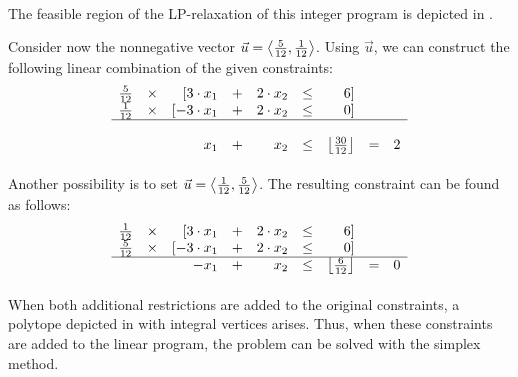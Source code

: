 {\begin{example}
\paragraph{}
The feasible region of the LP-relaxation of this integer program is depicted in .



Consider now the nonnegative vector $\vec{u}=\left\langle \frac{5}{12},\frac{1}{12} \right\rangle$. Using $\vec{u}$, we can construct the following linear combination of the given constraints:
\begin{equation}
\begin{array}{rcrcrcrcr}
\tfrac{5}{12}&\times&[3\cdot x_1&+&2\cdot x_2&\leq&6]&&\\
\tfrac{1}{12}&\times&[-3\cdot x_1&+&2\cdot x_2&\leq&0]&&\\\hline\\
&&x_1&+&x_2&\leq&\left\lfloor \frac{30}{12} \right\rfloor&=&2
\end{array}
\end{equation}

\paragraph{}
Another possibility is to set $\vec{u}=\left\langle \frac{1}{12},\frac{5}{12} \right\rangle$. The resulting constraint can be found as follows:
\begin{equation}
\begin{array}{rcrcrcrcr}
\tfrac{1}{12}&\times&[3\cdot x_1&+&2\cdot x_2&\leq&6]&&\\
\tfrac{5}{12}&\times&[-3\cdot x_1&+&2\cdot x_2&\leq&0]&&\\\hline
&&-x_1&+&x_2&\leq&\left\lfloor \tfrac{6}{12} \right\rfloor&=&0
\end{array}
\end{equation}

\paragraph{}
When both additional restrictions are added to the original constraints, a polytope depicted in  with integral vertices arises. Thus, when these constraints are added to the linear program, the problem can be solved with the simplex method.

\end{example}

}
